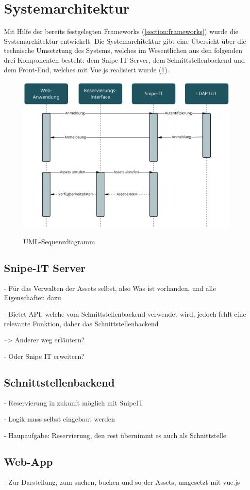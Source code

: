 \section{Systemarchitektur}
Mit Hilfe der bereits festgelegten Frameworks (\ref{section:frameworks}) wurde
die Systemarchitektur entwickelt. Die Systemarchitektur gibt eine Übersicht über
die technische Umsetztung des Systems, welches im Wesentlichen aus den folgenden
drei Komponenten besteht: dem Snipe-IT Server, dem Schnittstellenbackend und dem
Front-End, welches mit Vue.js realisiert wurde (\ref{fig:uml}).

\begin{figure}[h]
    \centering
    \includegraphics[scale=0.45]{Bilder/uml.pdf}
    \label{fig:uml}
    \caption[UML-Sequenzdiagramm]{UML-Sequenzdiagramm}
\end{figure}

\subsection{Snipe-IT Server}

- Für das Verwalten der Assets selbst, also Was ist vorhanden, und alle
Eigenschaften dazu

- Bietet API, welche vom Schnittstellenbackend verwendet wird, jedoch fehlt eine
relevante Funktion, daher das Schnittstellenbackend

--> Anderer weg erläutern?

- Oder Snipe IT erweitern?

\subsection{Schnittstellenbackend}
- Reservierung in zukunft möglich mit SnipeIT

- Logik muss selbst eingebaut werden

- Haupaufgabe: Reservierung, den rest übernimmt es auch als Schnittstelle

\subsection{Web-App}
- Zur Darstellung, zum suchen, buchen und so der Assets, umgesetzt mit vue.js





